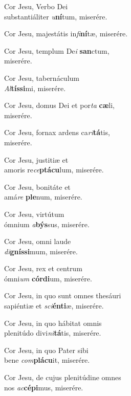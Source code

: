 \noindent Cor Jesu, Verbo Dei
 \\ \emspace substantiáliter \textit{u}\textbf{ní}tum, \hfill miserére.

\noindent Cor Jesu, majestátis in\textit{fi}\textbf{ní}tæ, \hfill miserére.

\noindent Cor Jesu, templum De\textit{i} \textbf{san}ctum,
\\ \zeroptspace \hfill miserére.

\noindent Cor Jesu, tabernáculum
 \\ \emspace \textit{Al}\textbf{tíssi}mi, \hfill miserére.

\noindent Cor Jesu, domus Dei et por\textit{ta} \textbf{cæ}li,
\\ \zeroptspace \hfill miserére.

\noindent Cor Jesu, fornax ardens ca\textit{ri}\textbf{tá}tis, 
\\ \zeroptspace \hfill miserére.

\noindent Cor Jesu, justitiæ et
 \\ \emspace amoris re\tinyhspace\textit{ce}\textbf{ptácu}lum, \hfill miserére.

\noindent Cor Jesu, bonitáte et 
 \\ \emspace amá\tinyhspace\textit{re} \textbf{ple}num, \hfill miserére.

\noindent Cor Jesu, virtútum
 \\ \emspace ó\-mnium \textit{a}\textbf{býs}sus, \hfill miserére.

\noindent Cor Jesu, omni laude
 \\ \emspace \textit{di}\textbf{gníssi}mum, \hfill miserére.

\noindent Cor Jesu, rex et centrum
 \\ \emspace ó\-mni\textit{um} \textbf{córdi}um, \hfill miserére.

\noindent Cor Jesu, in quo sunt o\-mnes thesáuri
\\ \emspace sapiéntiæ et \textit{sci}\textbf{énti}æ, \hfill miserére.

\noindent Cor Jesu, in quo hábitat o\-mnis
 \\ \emspace plenitúdo divi\tinyhspace\textit{ni}\textbf{tá}tis, \hfill miserére.

\noindent Cor Jesu, in quo Pater sibi 
 \\ \emspace bene \textit{com}\textbf{plácu}it, \hfill miserére.

\noindent Cor Jesu, de cujus plenitúdine o\-mnes 
 \\ \emspace nos \textit{ac}\tinyhspace\textbf{cépi}mus, \hfill miserére.

